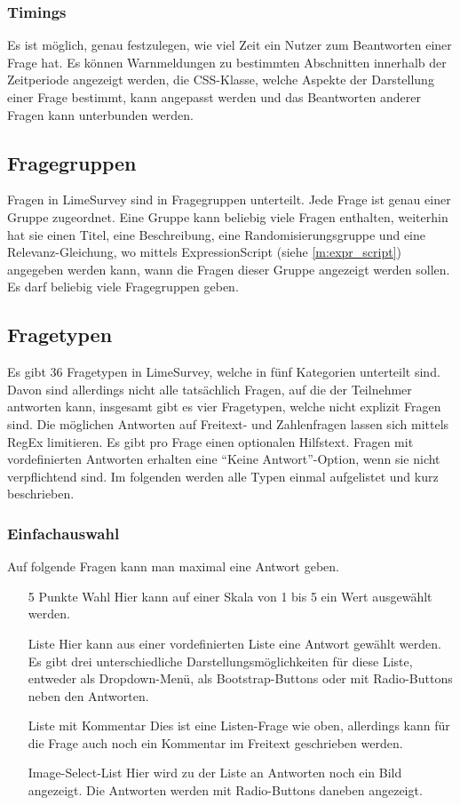 \subsubsection{Timings}

Es ist möglich, genau festzulegen, wie viel Zeit ein Nutzer zum Beantworten einer Frage hat.
Es können Warnmeldungen zu bestimmten Abschnitten innerhalb der Zeitperiode angezeigt werden, die CSS-Klasse, welche Aspekte der Darstellung einer Frage bestimmt, kann angepasst werden und das Beantworten anderer Fragen kann unterbunden werden.

\subsection{Fragegruppen}

Fragen in LimeSurvey sind in Fragegruppen unterteilt. Jede Frage ist genau einer Gruppe zugeordnet.
Eine Gruppe kann beliebig viele Fragen enthalten, weiterhin hat sie einen Titel, eine Beschreibung, eine Randomisierungsgruppe und eine Relevanz-Gleichung, wo mittels ExpressionScript (siehe \cref{m:expr_script}) angegeben werden kann, wann die Fragen dieser Gruppe angezeigt werden sollen.
Es darf beliebig viele Fragegruppen geben.

\subsection{Fragetypen}

Es gibt 36 Fragetypen in LimeSurvey, welche in fünf Kategorien unterteilt sind.
Davon sind allerdings nicht alle tatsächlich Fragen, auf die der Teilnehmer antworten kann, insgesamt gibt es vier Fragetypen, welche nicht explizit Fragen sind. %
Die möglichen Antworten auf Freitext- und Zahlenfragen lassen sich mittels RegEx limitieren.
Es gibt pro Frage einen optionalen Hilfstext.
Fragen mit vordefinierten Antworten erhalten eine \enquote{Keine Antwort}-Option, wenn sie nicht verpflichtend sind.
Im folgenden werden alle Typen einmal aufgelistet und kurz beschrieben.


\subsubsection{Einfachauswahl}

Auf folgende Fragen kann man maximal eine Antwort geben.
\begin{itemize}
	\item[5 Punkte Wahl] Hier kann auf einer Skala von 1 bis 5 ein Wert ausgewählt werden.
	\item[Liste] Hier kann aus einer vordefinierten Liste eine Antwort gewählt werden. Es gibt drei unterschiedliche Darstellungsmöglichkeiten für diese Liste, entweder als Dropdown-Menü, als Bootstrap-Buttons oder mit Radio-Buttons neben den Antworten.
	\item[Liste mit Kommentar] Dies ist eine Listen-Frage wie oben, allerdings kann für die Frage auch noch ein Kommentar im Freitext geschrieben werden.
	\item[Image-Select-List] Hier wird zu der Liste an Antworten noch ein Bild angezeigt. Die Antworten werden mit Radio-Buttons daneben angezeigt.
\end{itemize}

